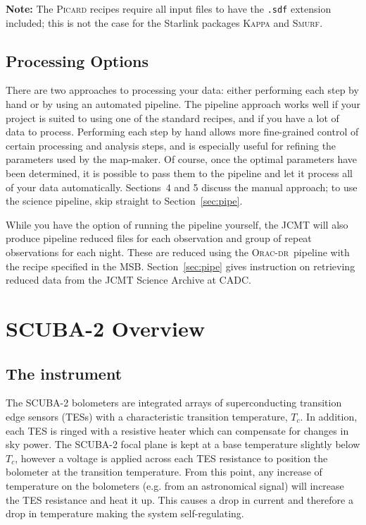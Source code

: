 \documentclass[twoside,11pt]{article}
\newcommand{\htmladdnormallink}[2]{#1}
\newcommand{\htmlref}[2]{#1}
\newcommand{\latexhtml}[2]{#1}
\newcommand{\xlabel}[1]{}
\renewcommand{\_}{\texttt{\symbol{95}}}
\newcommand{\oracdr}{\htmladdnormallink{\textsc{Orac-dr}}{http://www.oracdr.org/oracdr}}
\newcommand{\cref}[3]{\latexhtml{#1~\ref{#2}}{\htmlref{#3}{#2}}}
\begin{document}
\textbf{Note:} The \textsc{Picard} recipes require all input files to have
the \texttt{.sdf} extension included; this is not the case for the
Starlink packages \textsc{Kappa} and \textsc{Smurf}.

\subsection{\xlabel{options}Processing Options}

There are two approaches to processing your data: either performing
each step by hand or by using an automated pipeline. The pipeline
approach works well if your project is suited to using one of the
standard recipes, and if you have a lot of data to process. Performing
each step by hand allows more fine-grained control of certain
processing and analysis steps, and is especially useful for refining
the parameters used by the map-maker. Of course, once the optimal
parameters have been determined, it is possible to pass them to the
pipeline and let it process all of your data automatically. Sections~4
and 5 discuss the manual approach; to use the science pipeline, skip
straight to \cref{Section}{sec:pipe}{SCUBA-2 Pipeline}.

While you have the option of running the pipeline yourself, the JCMT
will also produce pipeline reduced files for each observation and
group of repeat observations for each night. These are reduced using
the \oracdr\ pipeline with the recipe specified in the MSB.
\cref{Section}{sec:pipe}{SCUBA-2 Pipeline} gives instruction on
retrieving reduced data from the
\htmladdnormallink{JCMT Science Archive}{http://www3.cadc-ccda.hia-iha.nrc-cnrc.gc.ca/jcmt/}
at CADC.


\clearpage
\section{\xlabel{scuba2_overview}SCUBA-2 Overview}
\subsection{\xlabel{scuba2}The instrument}
\label{sec:s2}

The SCUBA-2 bolometers are integrated arrays of superconducting
transition edge sensors (TESs) with a characteristic transition
temperature, $T_c$. In addition, each TES is ringed with a resistive
heater which can compensate for changes in sky power. The SCUBA-2
focal plane is kept at a base temperature slightly below $T_c$,
however a voltage is applied across each TES resistance to position
the bolometer at the transition temperature. From this point, any
increase of temperature on the bolometers (e.g. from an astronomical
signal) will increase the TES resistance and heat it up. This causes a
drop in current and therefore a drop in temperature making the system
self-regulating.
\end{document}
